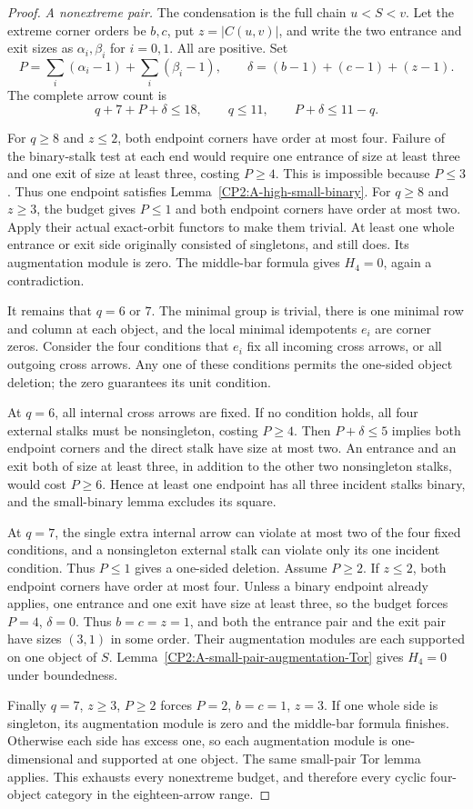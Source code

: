 \begin{proof}
\emph{A nonextreme pair.} The condensation is the full chain
$u<S<v$. Let the extreme corner orders be $b,c$, put
$z=|C(u,v)|$, and write the two entrance and exit sizes
as $\alpha_i,\beta_i$ for $i=0,1$. All are positive. Set
\[
 P=\sum_i(\alpha_i-1)+\sum_i(\beta_i-1),\qquad
 \delta=(b-1)+(c-1)+(z-1).
\]
The complete arrow count is
\[
 q+7+P+\delta\le18,\qquad q\le11,
 \qquad P+\delta\le11-q.
\]

For $q\ge8$ and $z\le2$, both endpoint corners have order
at most four. Failure of the binary-stalk test at each end
would require one entrance of size at least three and one
exit of size at least three, costing $P\ge4$. This is
impossible because $P\le3$. Thus one endpoint satisfies
Lemma~\ref{CP2:A-high-small-binary}. For $q\ge8$ and
$z\ge3$, the budget gives $P\le1$ and both endpoint corners
have order at most two. Apply their actual exact-orbit
functors to make them trivial. At least one whole entrance
or exit side originally consisted of singletons, and still
does. Its augmentation module is zero. The middle-bar
formula gives $H_4=0$, again a contradiction.

It remains that $q=6$ or $7$. The minimal group is trivial,
there is one minimal row and column at each object, and
the local minimal idempotents $e_i$ are corner zeros.
Consider the four conditions that $e_i$ fix all incoming
cross arrows, or all outgoing cross arrows. Any one of
these conditions permits the one-sided object deletion;
the zero guarantees its unit condition.

At $q=6$, all internal cross arrows are fixed. If no
condition holds, all four external stalks must be
nonsingleton, costing $P\ge4$. Then $P+\delta\le5$ implies
both endpoint corners and the direct stalk have size at
most two. An entrance and an exit both of size at least
three, in addition to the other two nonsingleton stalks,
would cost $P\ge6$. Hence at least one endpoint has all
three incident stalks binary, and the small-binary lemma
excludes its square.

At $q=7$, the single extra internal arrow can violate at
most two of the four fixed conditions, and a nonsingleton
external stalk can violate only its one incident condition.
Thus $P\le1$ gives a one-sided deletion. Assume $P\ge2$.
If $z\le2$, both endpoint corners have order at most four.
Unless a binary endpoint already applies, one entrance
and one exit have size at least three, so the budget
forces $P=4$, $\delta=0$. Thus $b=c=z=1$, and both the
entrance pair and the exit pair have sizes $(3,1)$ in
some order. Their augmentation modules are each supported
on one object of $S$. Lemma~\ref{CP2:A-small-pair-augmentation-Tor}
gives $H_4=0$ under boundedness.

Finally $q=7$, $z\ge3$, $P\ge2$ forces
$P=2$, $b=c=1$, $z=3$. If one whole side is singleton,
its augmentation module is zero and the middle-bar
formula finishes. Otherwise each side has excess one,
so each augmentation module is one-dimensional and
supported at one object. The same small-pair Tor lemma
applies. This exhausts every nonextreme budget, and
therefore every cyclic four-object category in the
eighteen-arrow range.
\end{proof}
